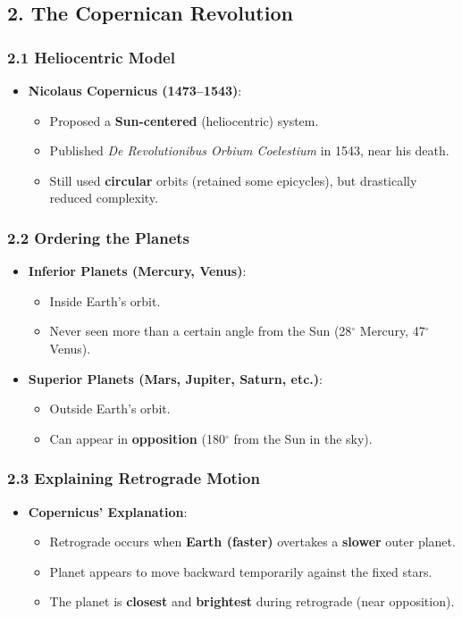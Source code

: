 \subsection*{2. The Copernican Revolution}

\subsubsection*{2.1 Heliocentric Model}
\begin{itemize}
    \item \textbf{Nicolaus Copernicus (1473--1543)}:
    \begin{itemize}
        \item Proposed a \textbf{Sun-centered} (heliocentric) system.
        \item Published \textit{De Revolutionibus Orbium Coelestium} in 1543, near his death.
        \item Still used \textbf{circular} orbits (retained some epicycles), but drastically reduced complexity.
    \end{itemize}
\end{itemize}

\subsubsection*{2.2 Ordering the Planets}
\begin{itemize}
    \item \textbf{Inferior Planets (Mercury, Venus)}:
    \begin{itemize}
        \item Inside Earth’s orbit.
        \item Never seen more than a certain angle from the Sun (28$^\circ$ Mercury, 47$^\circ$ Venus).
    \end{itemize}
    \item \textbf{Superior Planets (Mars, Jupiter, Saturn, etc.)}:
    \begin{itemize}
        \item Outside Earth’s orbit.
        \item Can appear in \textbf{opposition} (180$^\circ$ from the Sun in the sky).
    \end{itemize}
\end{itemize}

\subsubsection*{2.3 Explaining Retrograde Motion}
\begin{itemize}
    \item \textbf{Copernicus’ Explanation}:
    \begin{itemize}
        \item Retrograde occurs when \textbf{Earth (faster)} overtakes a \textbf{slower} outer planet.
        \item Planet appears to move backward temporarily against the fixed stars.
        \item The planet is \textbf{closest} and \textbf{brightest} during retrograde (near opposition).
    \end{itemize}
\end{itemize}

